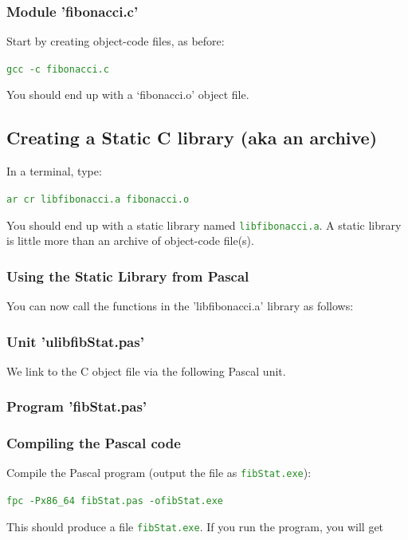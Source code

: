 \documentclass[10pt,a4paper]{article}
\newcommand{\mytext}[1]{\textcolor{ForestGreen}{\texttt{#1}}}
\begin{document}
\subsubsection*{Module 'fibonacci.c'}


\newpage
Start by creating object-code files, as before:

\mytext{gcc -c fibonacci.c}

You should end up with a `fibonacci.o' object file.

\subsection{Creating a Static C library (aka an archive)}
In a terminal, type:

\mytext{ar cr libfibonacci.a fibonacci.o}

You should end up with a static library named \mytext{libfibonacci.a}.
A static library is little more than an archive of object-code file(s).

\subsubsection{Using the Static Library from Pascal}
\lstset{style=myPascal}

You can now call the functions in the 'libfibonacci.a' library as follows:

\subsubsection*{Unit 'ulibfibStat.pas'}
We link to the C object file via the following Pascal unit.


\newpage
\subsubsection*{Program 'fibStat.pas'}


\newpage
\subsubsection*{Compiling the Pascal code}
Compile the Pascal program (output the file as \mytext{fibStat.exe}):

\mytext{fpc -Px86\_64 fibStat.pas -ofibStat.exe}

This should produce a file \mytext{fibStat.exe}. If you run the program,
you will get
\end{document}
